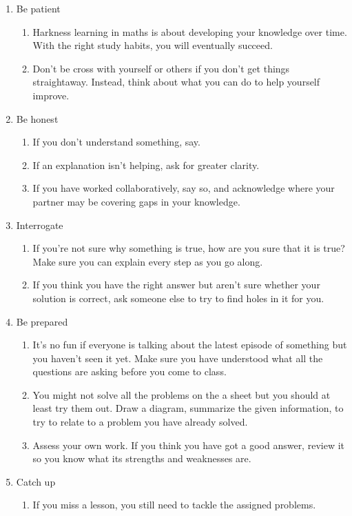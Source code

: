 \documentclass[class=exam, crop=false, 12pt]{standalone}
\begin{document}
\begin{enumerate}
\item Be patient
\begin{enumerate}
\item Harkness learning in maths is about developing your knowledge over time. With the right study habits, you will eventually succeed.
\item Don't be cross with yourself or others if you don't get things straightaway. Instead, think about what you can do to help yourself improve.
\end{enumerate}
\item Be honest
\begin{enumerate}
\item If you don't understand something, say.
\item If an explanation isn't helping, ask for greater clarity.
\item If you have worked collaboratively, say so, and acknowledge where your partner may be covering gaps in your knowledge.
\end{enumerate}
\item Interrogate
\begin{enumerate}
\item If you're not sure why something is true, how are you sure that it is true? Make sure you can explain every step as you go along.
\item If you think you have the right answer but aren't sure whether your solution is correct, ask someone else to try to find holes in it for you.
\end{enumerate}
\item Be prepared
\begin{enumerate}
\item It's no fun if everyone is talking about the latest episode of something but you haven't seen it yet. Make sure you have understood what all the questions are asking before you come to class.
\item You might not solve all the problems on the a sheet but you should at least try them out. Draw a diagram, summarize the given information, to try to relate to a problem you have already solved.
\item Assess your own work. If you think you have got a good answer, review it so you know what its strengths and weaknesses are.
\end{enumerate}
\item Catch up
\begin{enumerate}
\item If you miss a lesson, you still need to tackle the assigned problems.

\end{enumerate}
\end{enumerate}
\end{document}
